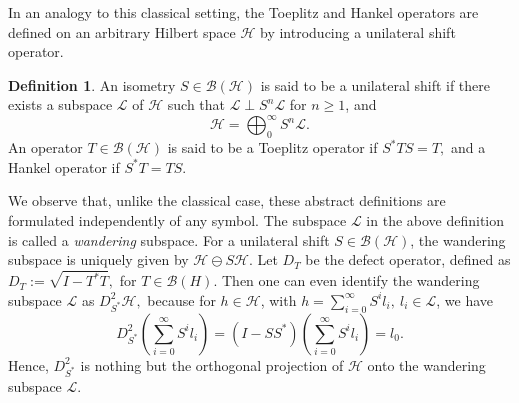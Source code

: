 \documentclass[12pt, reqno]{amsart}
\theoremstyle{definition}
\newtheorem{definition}[theorem]{Definition}
\theoremstyle{remark}
\numberwithin{equation}{section}
\begin{document}
    In an analogy to this classical setting, the Toeplitz and Hankel operators are defined on an arbitrary Hilbert space $\mathcal{H}$ by introducing a unilateral shift operator.

    \begin{definition}
        An isometry $S\in \mathcal{B}(\mathcal{H})$ is said to be a unilateral shift if there exists a subspace $\mathcal{L}$ of $\mathcal{H}$ such that $\mathcal{L} \perp S^n\mathcal{L}$ for $n\geq 1$, and $$\mathcal{H}=\bigoplus_{0}^{\infty}S^n\mathcal{L}.$$
       An operator $T\in \mathcal{B}(\mathcal{H})$ is said to be a Toeplitz operator if $S^*TS=T,$ and a Hankel operator if $S^*T=TS.$
    \end{definition}
    We observe that, unlike the classical case, these abstract definitions are formulated independently of any symbol. The subspace $\mathcal{L}$ in the above definition is called a \emph{wandering} subspace. For a unilateral shift $S\in \mathcal{B}(\mathcal{H})$, the wandering subspace is uniquely given by $\mathcal{H}\ominus S\mathcal{H}.$ 
    Let $D_T$ be the defect operator, defined as $D_{T} := \sqrt{I-T^*T},$ for $T\in \mathcal{B}(H)$. Then one can even identify the wandering subspace $\mathcal{L}$ as $D^2_{S^*}\mathcal{H},$ because for $h\in \mathcal{H}$, with $h=\sum_{i=0}^{\infty}S^il_i, ~l_i \in \mathcal{L}$, we have 
    $$ D^2_{S^*}(\sum_{i=0}^{\infty}S^il_i)=  (I-SS^*)(\sum_{i=0}^{\infty}S^il_i)=l_0. $$
    Hence, $D^2_{S^*}$ is nothing but the orthogonal projection of $\mathcal{H}$ onto the wandering subspace $\mathcal{L}.$
\end{document}
